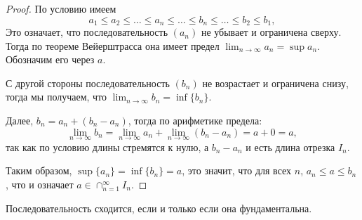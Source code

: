 \begin{proof}
    По условию имеем
    \[
    a_1 \le a_2 \le \ldots \le a_n \le \ldots \le b_n \le \ldots \le b_2 \le b_1,
    \]
    Это означает, что последовательность $(a_n)$ не убывает и ограничена сверху. Тогда по теореме Вейерштрасса она имеет предел $\lim_{n \to \infty} a_n = \sup{a_n}$. Обозначим его через $a$. 

    С другой стороны последовательность $(b_n)$ не возрастает и ограничена снизу, тогда мы получаем, что $\lim_{n\to \infty} b_n = \inf\{b_n\}$.
    
    Далее, $b_n = a_n + (b_n - a_n)$, тогда по арифметике предела:
    \[
     \lim_{n \to \infty}b_n = \lim_{n \to \infty} a_n + \lim_{n \to \infty} (b_n - a_n) = a + 0 =a,
    \]
    так как по условию длины стремятся к нулю, а $b_n - a_n$ и есть длина отрезка $I_n.$
 
    Таким образом, $\sup\{a_n\} = \inf\{b_n\} =a$, \ie это значит, что для всех $n$, $a_n \le a \le b_n$, что и означает $a \in \cap_{n=1}^\infty I_n.$
\end{proof}


\begin{theorem}\label{Coshy}
   Последовательность сходится, если и только если она фундаментальна. 
\end{theorem}

